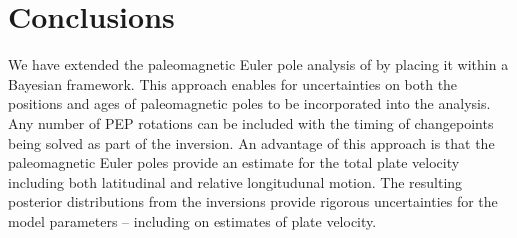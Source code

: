 \documentclass[11pt,letterpaper]{article}
\begin{document}
\section*{Conclusions}
\label{sec:conclusions}


We have extended the paleomagnetic Euler pole analysis of \citet{Gordon1984a} by placing it within a Bayesian framework. This approach enables for uncertainties on both the positions and ages of paleomagnetic poles to be incorporated into the analysis. Any number of PEP rotations can be included with the timing of changepoints being solved as part of the inversion. An advantage of this approach is that the paleomagnetic Euler poles provide an estimate for the total plate velocity including both latitudinal and relative longitudunal motion. The resulting posterior distributions from the inversions provide rigorous uncertainties for the model parameters -- including on estimates of plate velocity. 
\end{document}
